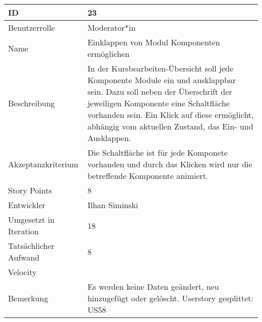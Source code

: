 \begin{tabularx}{\textwidth}{|p{}|X|}
	\hline
	ID & 23\\
	\hline
	Benutzerrolle & Moderator*in\\
	\hline
	Name & Einklappen von Modul Komponenten ermöglichen\\
	\hline
	Beschreibung & In der Kursbearbeiten-Übersicht soll jede Komponente Module ein und ausklappbar sein.
		Dazu soll neben der Überschrift der jeweiligen Komponente eine Schaltfläche vorhanden sein.
		Ein Klick auf diese ermöglicht, abhängig vom aktuellen Zustand, das Ein- und Ausklappen. \\
	\hline
	Akzeptanzkriterium & Die Schaltfläche ist für jede Komponete vorhanden und durch das Klicken wird nur die betreffende Komponente animiert.\\
	\hline
	Story Points & 8 \\
	\hline
	Entwickler & Ilhan Siminski\\
	\hline
	Umgesetzt in Iteration & 18\\
	\hline
	Tatsächlicher Aufwand & 8\\
	\hline
	Velocity & \\
	\hline
	Bemerkung & Es werden keine Daten geändert, neu hinzugefügt oder gelöscht. Userstory gesplittet: US58\\
	\hline
\end{tabularx}
\vspace{20pt}
